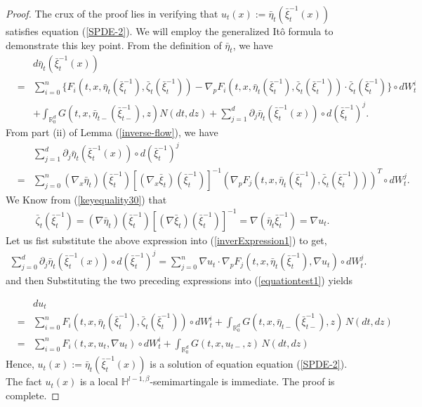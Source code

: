 \documentclass[12pt,oneside, reqno]{amsart}
\newcommand{\be}{\begin{eqnarray}}
\newcommand{\ee}{\end{eqnarray}}
\newcommand{\ce}{\begin{eqnarray*}}
\newcommand{\de}{\end{eqnarray*}}
\def\no{\nonumber}
\def\mH{{\mathbb H}}
\def\mR{{\mathbb R}}
\numberwithin{equation}{section}
\begin{document}
\begin{proof}
	The crux of the proof lies in verifying that $u_t(x):=\bar{\eta}_t(\bar{\xi}_t^{-1}(x))$ satisfies equation  (\ref{SPDE-2}). We will employ the generalized It\^{o} formula to demonstrate this key point. From the definition of $\bar{\eta}_t$, we have  
	\be\label{equationtest1}
	&&d\bar{\eta}_t(\bar{\xi}_t^{-1}(x))\no\\
	&=& \sum_{i=0}^{n} \bigg\{F_i(t,x,\bar{\eta}_t(\bar{\xi}_t^{-1}),\bar{\zeta}_t(\bar{\xi}_t^{-1}))- \nabla_pF_i(t,x,\bar{\eta}_t(\bar{\xi}_t^{-1}),\bar{\zeta}_t(\bar{\xi}_t^{-1}))\cdot\bar{\zeta}_t(\bar{\xi}_t^{-1}) \bigg\}\circ dW_t^i\no\\
	&&+\int_{\mR^d_0}G(t,x,\bar{\eta}_{t-}(\bar{\xi}_{t-}^{-1}),z) N(dt,dz)+\sum_{j=1}^d\partial_j \bar{\eta}_{t}(\bar{\xi}_{t}^{-1}(x))\circ d(\bar{\xi}_t^{-1})^j.
	\ee 
	From part (ii) of Lemma (\ref{inverse-flow}), we have 
	\be\label{inverExpression1}
	&&\sum_{j=1}^d\partial_j \bar{\eta}_t(\bar{\xi}_t^{-1}(x))\circ d(\bar{\xi}_t^{-1})^j\no\\
	&=&\sum_{j=0}^n(\nabla_x\bar{\eta}_t)(\bar{\xi}_t^{-1})[(\nabla_x\bar{\xi}_t)(\bar{\xi}_t^{-1})]^{-1}(\nabla_pF_j(t,x,\bar{\eta}_t(\bar{\xi}_t^{-1}) ,\bar{\zeta}_t(\bar{\xi}_t^{-1})))^T\circ dW_t^j.
	\ee 
	We Know from (\ref{keyequality30}) that 
    \ce 
    \bar{\zeta}_t(\bar{\xi}_t^{-1})=(\nabla\bar{\eta}_t)(\bar{\xi}_t^{-1})[(\nabla \bar{\xi}_t)(\bar{\xi}_t^{-1})]^{-1}=\nabla(\bar{\eta}_t\bar{\xi}_t^{-1})=\nabla u_t.
    \de 
   Let us fist substitute the above expression into (\ref{inverExpression1}) to get, 
    \ce 
   \sum_{j=0}^d\partial_j \bar{\eta}_t(\bar{\xi}_t^{-1}(x))\circ d(\bar{\xi}_t^{-1})^j
   =\sum_{j=0}^n\nabla u_t\cdot\nabla_pF_j(t,x,\bar{\eta}_t(\bar{\xi}_t^{-1}) ,\nabla u_t)\circ dW_t^j.
   \de 
    and then Substituting the two preceding expressions into (\ref{equationtest1}) yields
 
    	\ce 
    &&du_t\\
    &=& \sum_{i=0}^{n}F_i(t,x,\bar{\eta}_t(\bar{\xi}_t^{-1}),\bar{\zeta}_t(\bar{\xi}_t^{-1}))\circ dW_t^i+\int_{\mR^d_0}G(t,x,\bar{\eta}_{t-}(\bar{\xi}_{t-}^{-1}),z)\, N(dt,dz)\\
     &=&\sum_{i=0}^{n}F_i(t,x,u_t,\nabla u_t)\circ dW_t^i+\int_{\mR^d_0}G(t,x,u_{t-},z)\, N(dt,dz)
    \de 
	Hence,  $u_t(x):=\bar{\eta}_t(\bar{\xi}_t^{-1}(x))$ is a solution of equation equation (\ref{SPDE-2}). The fact $u_t(x)$ is a local $\mH^{l-1,\beta}$-semimartingale is immediate. The proof is complete.
\end{proof}
	
\end{document}
